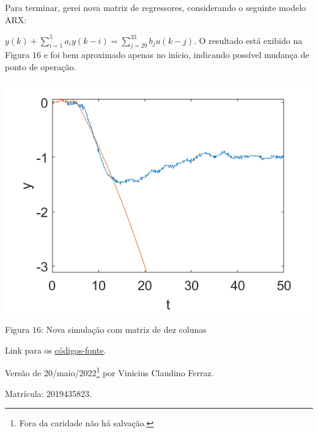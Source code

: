 \documentclass{rbfin}
\begin{document}
\newpage

Para terminar, gerei nova matriz de regressores, considerando o seguinte modelo ARX:

$y(k) + \sum_{i=1}^5 a_i y(k-i) = \sum_{j = 29}^{33} b_j u(k - j)$. O resultado está exibido na Figura $16$ e foi bem aproximado apenas no início, indicando possível mudança de ponto de operação.

\begin{center}
\includegraphics[scale=0.666]{44b}

Figura $16$: Nova simulação com matriz de dez colunas
\end{center}

\vspace{6mm}

Link para os \href{https://drive.google.com/file/d/1c9wNTYZ-MPxCvBaisc35zPRq-oZGPTos/view?usp=sharing}{\color{blue}\underline{códigos-fonte}}.

Versão de 20/maio/2022\footnote{Fora da caridade não há salvação.} por Vinicius Claudino Ferraz. 

Matrícula: 2019435823.
\end{document}
